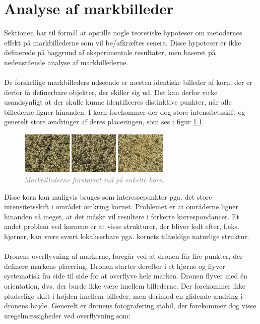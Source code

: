 \chapter{Analyse af markbilleder} \label{sec:mark}
Sektionen har til formål at opstille nogle teoretiske hypoteser om metodernes effekt på markbillederne som vil be/afkræftes senere. Disse hypoteser er ikke definerede på baggrund af eksperimentale resultater, men baseret på nedenstående analyse af markbillederne. \\ \\
De forskellige markbilleders udseende er næsten identiske billeder af korn, der er derfor få definerbare objekter, der skiller sig ud. Det kan derfor virke usandsynligt at der skulle kunne identificeres distinktive punkter, når alle billederne ligner hinanden. I korn forekommer der dog store intensitetsskift og generelt store ændringer af deres placeringen, som ses i figur \ref{fig:korn}.
\begin{figure}[H]
    \centering
    \includegraphics[width=0.65\textwidth]{fig/20.png}
     \vspace{-1em}
    \begin{center}    
       \caption{\textcolor{gray}{\footnotesize \textit{Markbillederne forstørret ind på enkelte korn.}}}
    \label{fig:korn}
     \end{center}
     \vspace{-2.5em}
  \end{figure} \noindent
Disse korn kan muligvis bruges som interessepunkter pga. det store intensitetsskift i området omkring kornet. Problemet er at områderne ligner hinanden så meget, at det måske vil resultere i forkerte korrespondancer. Et andet problem ved kornene er at visse strukturer, der bliver ledt efter, f.eks. hjørner, kan være svært lokaliserbare pga. kornets tilfældige naturlige struktur. \\ \\
Dronens overflyvning af markerne, foregår ved at dronen får fire punkter, der definere markens placering. Dronen starter derefter i et hjørne og flyver systematisk fra side til side for at overflyve hele marken. Dronen flyver med én orientation, dvs. der burde ikke være imellem billederne. Der forekommer ikke pludselige skift i højden imellem billeder, men derimod en glidende ændring i dronens højde. Generelt er dronens fotografering stabil, der forekommer dog visse uregelmæssigheder ved overflyvning som:
